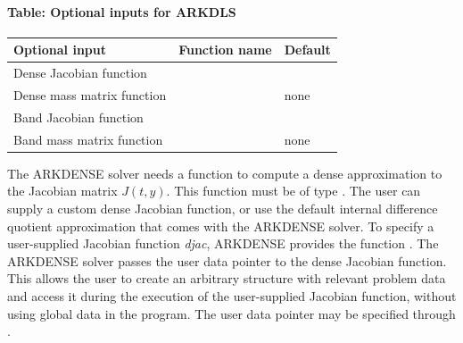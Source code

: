\documentclass[letterpaper,10pt,english]{sphinxmanual}
\begin{document}
\paragraph{Table: Optional inputs for ARKDLS}
\label{c_interface/User_callable:table-optional-inputs-for-arkdls}
\begin{tabulary}{\linewidth}{|L|L|L|}
\hline
\textbf{\relax 
Optional input
} & \textbf{\relax 
Function name
} & \textbf{\relax 
Default
}\\\hline

Dense Jacobian function
 & 
{\hyperref[c_interface/User_callable:ARKDlsSetDenseJacFn]{}}
 & 
\\\hline

Dense mass matrix function
 & 
{\hyperref[c_interface/User_callable:ARKDlsSetDenseMassFn]{}}
 & 
none
\\\hline

Band Jacobian function
 & 
{\hyperref[c_interface/User_callable:ARKDlsSetBandJacFn]{}}
 & 
\\\hline

Band mass matrix function
 & 
{\hyperref[c_interface/User_callable:ARKDlsSetBandMassFn]{}}
 & 
none
\\\hline
\end{tabulary}


The ARKDENSE solver needs a function to compute a dense approximation
to the Jacobian matrix $J(t,y)$. This function must be of type
{\hyperref[c_interface/User_supplied:ARKDlsDenseJacFn]{}}.  The user can supply a custom dense
Jacobian function, or use the default internal difference quotient
approximation that comes with the ARKDENSE solver.  To specify a
user-supplied Jacobian function \emph{djac}, ARKDENSE provides the
function {\hyperref[c_interface/User_callable:ARKDlsSetDenseJacFn]{}}. The ARKDENSE solver
passes the user data pointer to the dense Jacobian function. This
allows the user to create an arbitrary structure with relevant problem
data and access it during the execution of the user-supplied Jacobian
function, without using global data in the program. The user
data pointer may be specified through {\hyperref[c_interface/User_callable:ARKodeSetUserData]{}}.
\end{document}

